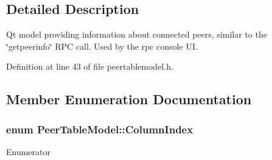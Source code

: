 \subsection{Detailed Description}
Qt model providing information about connected peers, similar to the \char`\"{}getpeerinfo\char`\"{} R\+P\+C call. Used by the rpc console U\+I. 

Definition at line 43 of file peertablemodel.\+h.



\subsection{Member Enumeration Documentation}
\hypertarget{class_peer_table_model_a10a32ec5f31c9765c80b611760f7e590}{}
\subsubsection[{Column\+Index}]{\setlength{\rightskip}{0pt plus 5cm}enum {\bf Peer\+Table\+Model\+::\+Column\+Index}}\label{class_peer_table_model_a10a32ec5f31c9765c80b611760f7e590}
\begin{Desc}
\item[Enumerator]\par
\begin{description}
\item[{\em 
\hypertarget{class_peer_table_model_a10a32ec5f31c9765c80b611760f7e590a101063cc6b840d0857aa79929703d16a}{}Address\label{class_peer_table_model_a10a32ec5f31c9765c80b611760f7e590a101063cc6b840d0857aa79929703d16a}
}]\item[{\em 
\hypertarget{class_peer_table_model_a10a32ec5f31c9765c80b611760f7e590aa4408c536a178490700310f01cf0d455}{}Subversion\label{class_peer_table_model_a10a32ec5f31c9765c80b611760f7e590aa4408c536a178490700310f01cf0d455}
}]\item[{\em 
\hypertarget{class_peer_table_model_a10a32ec5f31c9765c80b611760f7e590a7e5e92f542ecbb90307e99c213274957}{}Ping\label{class_peer_table_model_a10a32ec5f31c9765c80b611760f7e590a7e5e92f542ecbb90307e99c213274957}
}]\end{description}
\end{Desc}


